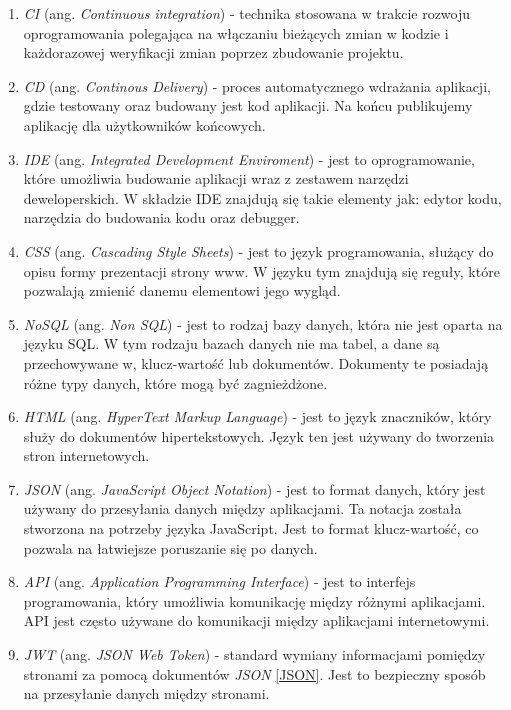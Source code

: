 \begin{enumerate}
    \item \label{CI} \textit{CI} (ang. \textit{Continuous integration}) - technika stosowana w trakcie rozwoju oprogramowania polegająca na włączaniu bieżących zmian w kodzie i każdorazowej weryfikacji zmian poprzez zbudowanie projektu.
    \item \label{CD} \textit{CD} (ang. \textit{Continous Delivery}) - proces automatycznego wdrażania aplikacji, gdzie testowany oraz budowany jest kod aplikacji. Na końcu publikujemy aplikację dla użytkowników końcowych.
    \item \label{IDE} \textit{IDE} (ang. \textit{Integrated Development Enviroment}) - jest to oprogramowanie, które umożliwia budowanie aplikacji wraz z zestawem narzędzi deweloperskich. W składzie IDE znajdują się takie elementy jak: edytor kodu, narzędzia do budowania kodu oraz debugger.
    \item \label{CSS} \textit{CSS} (ang. \textit{Cascading Style Sheets}) - jest to język programowania, służący do opisu formy prezentacji strony www. W języku tym znajdują się reguły, które pozwalają zmienić danemu elementowi jego wygląd.
    \item \label{NoSQL} \textit{NoSQL} (ang. \textit{Non SQL}) - jest to rodzaj bazy danych, która nie jest oparta na języku SQL. W tym rodzaju bazach danych nie ma tabel, a dane są przechowywane w, klucz-wartość lub dokumentów. Dokumenty te posiadają różne typy danych, które mogą być zagnieżdżone.
    \item \label{HTML} \textit{HTML} (ang. \textit{HyperText Markup Language}) - jest to język znaczników, który służy do dokumentów hipertekstowych. Język ten jest używany do tworzenia stron internetowych.
    \item \label{JSON} \textit{JSON} (ang. \textit{JavaScript Object Notation}) - jest to format danych, który jest używany do przesyłania danych między aplikacjami. Ta notacja została stworzona na potrzeby języka JavaScript. Jest to format klucz-wartość, co pozwala na łatwiejsze poruszanie się po danych.
    \item \label{API} \textit{API} (ang. \textit{Application Programming Interface}) - jest to interfejs programowania, który umożliwia komunikację między różnymi aplikacjami. API jest często używane do komunikacji między aplikacjami internetowymi.
    \item \label{JWT} \textit{JWT} (ang. \textit{JSON Web Token}) - standard wymiany informacjami pomiędzy stronami za pomocą dokumentów \textit{JSON} \ref{JSON}. Jest to bezpieczny sposób na przesyłanie danych między stronami.
\end{enumerate}
